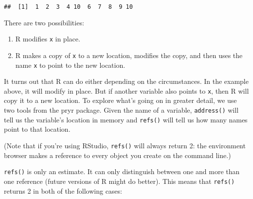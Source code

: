 \begin{verbatim}
##  [1]  1  2  3  4 10  6  7  8  9 10
\end{verbatim}

There are two possibilities:

\begin{enumerate}
\def\labelenumi{\arabic{enumi}.}
\item
  R modifies \texttt{x} in place.
\item
  R makes a copy of \texttt{x} to a new location, modifies the copy, and
  then uses the name \texttt{x} to point to the new location.
\end{enumerate}

It turns out that R can do either depending on the circumstances. In the
example above, it will modify in place. But if another variable also
points to \texttt{x}, then R will copy it to a new location. To explore
what's going on in greater detail, we use two tools from the pryr
package. Given the name of a variable, \texttt{address()} will tell us
the variable's location in memory and \texttt{refs()} will tell us how
many names point to that location.  

\begin{Shaded}
\begin{Highlighting}[]
\StringTok{ }\OperatorTok{:}
\NormalTok{(}

\StringTok{ }
\NormalTok{(}
\end{Highlighting}
\end{Shaded}

(Note that if you're using RStudio, \texttt{refs()} will always return
2: the environment browser makes a reference to every object you create
on the command line.)

\texttt{refs()} is only an estimate. It can only distinguish between one
and more than one reference (future versions of R might do better). This
means that \texttt{refs()} returns 2 in both of the following cases:

\begin{Shaded}
\begin{Highlighting}[]
\StringTok{ }\OperatorTok{:}
\StringTok{ }
\end{Highlighting}
\end{Shaded}

